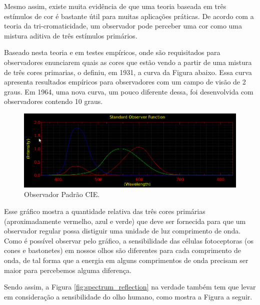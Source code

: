 \documentclass[a4paper,10pt]{report}
\begin{document}
\par
Mesmo assim, existe muita evidência de que uma teoria baseada em três estímulos
de cor é bastante útil para muitas aplicações práticas. De acordo com a teoria
da tri-cromaticidade, um observador pode perceber uma cor como uma mistura
aditiva de três estímulos primários.

\par
Baseado nesta teoria e em testes empíricos, onde são requisitados para
observadores enunciarem quais as cores que estão vendo a partir de uma mistura
de três cores primarias, o  definiu, em 1931,
a curva da Figura abaixo. Essa curva apresenta resultados empíricos para
observadores com um campo de visão de 2 graus. Em 1964, uma nova curva, um
pouco diferente dessa, foi desenvolvida com observadores contendo 10 graus.

\begin{figure}[!htb]
     \centering
     \includegraphics[scale=0.8]{img/cie_std_observer.png}
     \caption{Observador Padrão CIE.}
     \label{fig:standard_observer}
\end{figure}

\par
Esse gráfico mostra a quantidade relativa das três cores primárias
(aproximadamente vermelho, azul e verde) que deve ser fornecida para que um
observador regular possa distiguir uma unidade de luz comprimento de onda. Como
é possível observar pelo gráfico, a sensibilidade das células fotoceptoras
(os cones e bastonetes) em nossos olhos são diferentes para cada comprimento de
onda, de tal forma que a energia em alguns comprimentos de onda precisam ser
maior para percebemos alguma diferença.

\par
Sendo assim, a Figura \ref{fig:spectrum_reflection} na verdade também tem que
levar em consideração a sensibilidade do olho humano, como mostra a Figura a
seguir.
\end{document}
